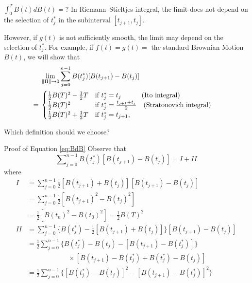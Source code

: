 \documentclass[letterpaper,handout]{beamer}
\def\Sum{\sum\nolimits}
\begin{document}
\begin{frame}{$\int_0^T B(t)dB(t)=$?}
In Riemann--Stieltjes integral, the limit does not depend on the selection of $t_j^*$ in the subinterval $[t_{j+1}, t_{j}]$.\bigskip

However, if $g(t)$ is not sufficiently smooth, the limit may depend on the  selection of $t_j^*$.
For example, if $f(t)=g(t)=$ the standard Brownian Motion $B(t)$, we will show that
\begin{align}
&\lim_{\|\Pi\|\to 0}\sum_{j=0}^{n-1}B(t_j^*)[B(t_{j+1})-B(t_j)]\cr
={}&
\begin{cases}
\frac{1}{2}B(T)^2-\frac{1}{2}T&\mbox{if }t_j^*=t_j\qquad\quad(\mbox{Ito integral})\\
\frac{1}{2}B(T)^2&\mbox{if }t_j^*=\frac{t_{j+1}+t_j}{2}\quad(\mbox{Stratonovich integral})\\
\frac{1}{2}B(T)^2+\frac{1}{2}T&\mbox{if }t_j^*=t_{j+1},
\end{cases}\label{eq:BdB}
\end{align}

Which definition should we choose?
\end{frame}
\begin{frame}{Proof of Equation \eqref{eq:BdB}}
Observe that
$$\Sum_{j=0}^{n-1}B(t_j^*)[B(t_{j+1})-B(t_j)]=I+II$$
where
\begin{align*}
I &=\Sum_{j=0}^{n-1}\frac{1}{2}[B(t_{j+1})+B(t_j)][B(t_{j+1})-B(t_j)]\\
  &=\Sum_{j=0}^{n-1}\frac{1}{2}[B(t_{j+1})^2-B(t_j)^2]\\
  &=\frac{1}{2}[B(t_{n})^2-B(t_0)^2]=\frac{1}{2}B(T)^2\\
II&=\Sum_{j=0}^{n-1}\{B(t_j^*)-\frac{1}{2}[B(t_{j+1})+B(t_j)]\}[B(t_{j+1})-B(t_j)]\\
&=\frac{1}{2}\Sum_{j=0}^{n-1}\{B(t_j^*)-B(t_j)-[B(t_{j+1})-B(t_j^*)]\}\\
&\qquad\qquad\qquad\times[B(t_{j+1})-B(t_j^*)+B(t_j^*)-B(t_j)]\\
&=\frac{1}{2}\Sum_{j=0}^{n-1}\{[B(t_j^*)-B(t_j)]^2-[B(t_{j+1})-B(t_j^*)]^2\}
\end{align*}
\end{frame}
\end{document}

